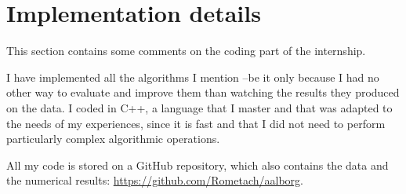 \documentclass[a4paper,10pt]{article}
\begin{document}
\clearpage

\section{Implementation details}

This section contains some comments on the coding part of the internship.

I have implemented all the algorithms I mention --be it only because I had no other way to evaluate and improve them than watching the results they produced on the data. I coded in C++, a language that I master and that was adapted to the needs of my experiences, since it is fast and that I did not need to perform particularly complex algorithmic operations.

All my code is stored on a GitHub repository, which also contains the data and the numerical results: \href{https://github.com/Rometach/aalborg}{https://github.com/Rometach/aalborg}.




%
%
%
\end{document}
